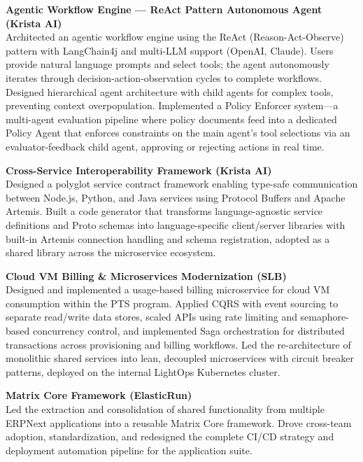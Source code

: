 \documentclass[a4paper,11pt]{article}
\begin{document}
\vspace{6pt}
\textbf{Agentic Workflow Engine --- ReAct Pattern Autonomous Agent (Krista AI)} \\
Architected an agentic workflow engine using the ReAct (Reason-Act-Observe) pattern with LangChain4j and multi-LLM support (OpenAI, Claude). Users provide natural language prompts and select tools; the agent autonomously iterates through decision-action-observation cycles to complete workflows. Designed hierarchical agent architecture with child agents for complex tools, preventing context overpopulation. Implemented a Policy Enforcer system---a multi-agent evaluation pipeline where policy documents feed into a dedicated Policy Agent that enforces constraints on the main agent's tool selections via an evaluator-feedback child agent, approving or rejecting actions in real time.

\vspace{6pt}
\textbf{Cross-Service Interoperability Framework (Krista AI)} \\
Designed a polyglot service contract framework enabling type-safe communication between Node.js, Python, and Java services using Protocol Buffers and Apache Artemis. Built a code generator that transforms language-agnostic service definitions and Proto schemas into language-specific client/server libraries with built-in Artemis connection handling and schema registration, adopted as a shared library across the microservice ecosystem.

\vspace{6pt}
\textbf{Cloud VM Billing \& Microservices Modernization (SLB)} \\
Designed and implemented a usage-based billing microservice for cloud VM consumption within the PTS program. Applied CQRS with event sourcing to separate read/write data stores, scaled APIs using rate limiting and semaphore-based concurrency control, and implemented Saga orchestration for distributed transactions across provisioning and billing workflows. Led the re-architecture of monolithic shared services into lean, decoupled microservices with circuit breaker patterns, deployed on the internal LightOps Kubernetes cluster.

\vspace{6pt}
\textbf{Matrix Core Framework (ElasticRun)} \\
Led the extraction and consolidation of shared functionality from multiple ERPNext applications into a reusable Matrix Core framework. Drove cross-team adoption, standardization, and redesigned the complete CI/CD strategy and deployment automation pipeline for the application suite.
\end{document}
